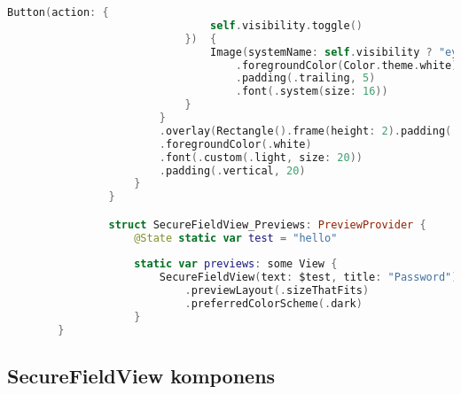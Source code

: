 \begin{minipage}{\textwidth}
    \linespread{0.8}\selectfont
    \begin{lstlisting}[language=swift]
        Button(action: {
                                self.visibility.toggle()
                            })  {
                                Image(systemName: self.visibility ? "eye.slash" : "eye.fill")
                                    .foregroundColor(Color.theme.white)
                                    .padding(.trailing, 5)
                                    .font(.system(size: 16))
                            }
                        }
                        .overlay(Rectangle().frame(height: 2).padding(.top, 35))
                        .foregroundColor(.white)
                        .font(.custom(.light, size: 20))
                        .padding(.vertical, 20)
                    }
                }

                struct SecureFieldView_Previews: PreviewProvider {
                    @State static var test = "hello"
                    
                    static var previews: some View {        
                        SecureFieldView(text: $test, title: "Password")
                            .previewLayout(.sizeThatFits)
                            .preferredColorScheme(.dark)
                    }
        }
    \end{lstlisting}   
\end{minipage}

\subsection*{SecureFieldView komponens}

